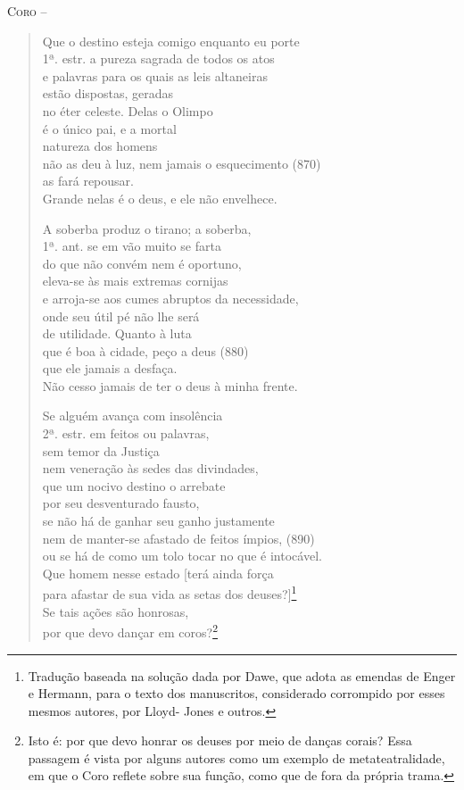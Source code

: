 \textsc{Coro} -- \begin{verse}Que o destino esteja comigo enquanto eu porte\\ 1ª. estr.
a pureza sagrada de todos os atos\\
e palavras para os quais as leis altaneiras\\
estão dispostas, geradas\\
no éter celeste. Delas o Olimpo\\
é o único pai, e a mortal\\
natureza dos homens\\
não as deu à luz, nem jamais o esquecimento (870)\\
as fará repousar.\\
Grande nelas é o deus, e ele não envelhece.

A soberba produz o tirano; a soberba,\\ 1ª. ant.
se em vão muito se farta\\
do que não convém nem é oportuno,\\
eleva-se às mais extremas cornijas\\
e arroja-se aos cumes abruptos da necessidade,\\
onde seu útil pé não lhe será\\
de utilidade. Quanto à luta\\
que é boa à cidade, peço a deus (880)\\
que ele jamais a desfaça.\\
Não cesso jamais de ter o deus à minha frente.

Se alguém avança com insolência\\ 2ª. estr.
em feitos ou palavras,\\
sem temor da Justiça\\
nem veneração às sedes das divindades,\\
que um nocivo destino o arrebate\\
por seu desventurado fausto,\\
se não há de ganhar seu ganho justamente\\
nem de manter-se afastado de feitos ímpios, (890)\\
ou se há de como um tolo tocar no que é intocável.\\
Que homem nesse estado {[}terá ainda força\\
para afastar de sua vida as setas dos deuses?{]}\footnote{Tradução
baseada na solução dada por Dawe, que adota as emendas de Enger e
Hermann, para o texto dos manuscritos, considerado corrompido por
esses mesmos autores, por Lloyd- Jones e outros.}\\
Se tais ações são honrosas,\\
por que devo dançar em coros?\footnote{Isto é: por que devo honrar os
  deuses por meio de danças corais? Essa passagem é vista por alguns
  autores como um exemplo de metateatralidade, em que o Coro reflete
  sobre sua função, como que de fora da própria trama.}


\end{verse}
